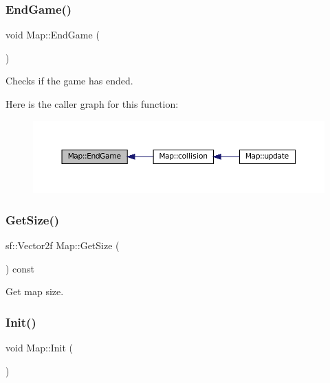 \subsubsection{\texorpdfstring{End\+Game()}{EndGame()}}
{\footnotesize\ttfamily void Map\+::\+End\+Game (\begin{DoxyParamCaption}{ }\end{DoxyParamCaption})}



Checks if the game has ended. 

Here is the caller graph for this function\+:\nopagebreak
\begin{figure}[H]
\begin{center}
\leavevmode
\includegraphics[width=350pt]{classMap_af58f98cfacd972d950201cc25df95982_icgraph}
\end{center}
\end{figure}
\mbox{\label{classMap_a0c46c2c55236317c42854758b1af682f}} 
\subsubsection{\texorpdfstring{Get\+Size()}{GetSize()}}
{\footnotesize\ttfamily sf\+::\+Vector2f Map\+::\+Get\+Size (\begin{DoxyParamCaption}{ }\end{DoxyParamCaption}) const}



Get map size. 

\mbox{\label{classMap_a67b222c575eee96246c2f3fd25b4912c}} 
\subsubsection{\texorpdfstring{Init()}{Init()}}
{\footnotesize\ttfamily void Map\+::\+Init (\begin{DoxyParamCaption}{ }\end{DoxyParamCaption})}



